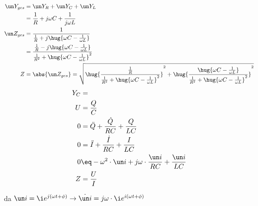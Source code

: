 \documentclass[11pt]{article}
\begin{document}
\subsection{}
\begin{align*}
    \un Y_{ges} &= \un Y_{R} +\un Y_{C} +\un Y_{L}\\
    &= \frac{1}{R} + j \omega C +  \frac{1}{j\omega L }\\
    \un Z_{ges} &= \frac{1}{ \frac{1}{R} + j \hug{\omega C - \frac{1}{\omega L }}}\\
    &= \frac{\frac{1}{R} - j \hug{\omega C - \frac{1}{\omega L }}}{ \frac{1}{R^2} + \hug{\omega C - \frac{1}{\omega L }}^2}\\
    Z &= \abs{\un Z_{ges}} = \sqrt{\hug{\frac{\frac{1}{R}}{ \frac{1}{R^2} + \hug{\omega C - \frac{1}{\omega L }}^2}}^2
     + \hug{ \frac{\hug{\omega C - \frac{1}{\omega L }}}{ \frac{1}{R^2} + \hug{\omega C - \frac{1}{\omega L }}^2}}^2}
\end{align*}
\begin{align*}
    Y_C &= \\
    U &= \frac QC\\
    0 &= \ddot Q + \frac{\dot Q}{R C} + \frac Q{LC} \\
    0 &= \ddot I + \frac{\dot I}{R C} + \frac I{LC} \\
    0 &\eq -\omega^2\cdot \un i + j\omega\cdot\frac{\un i}{R C} + \frac {\un i}{LC} \\
    Z &= \frac{U}{I}
\end{align*}
\begin{adjustwidth}{20pt}{}
    \con da \(\un i = \i e^{j(\omega t + \phi)} \rightarrow \dot{\un i} = j\omega \cdot \i e^{i(\omega t + \phi)}\) 
\end{adjustwidth}
\end{document}
